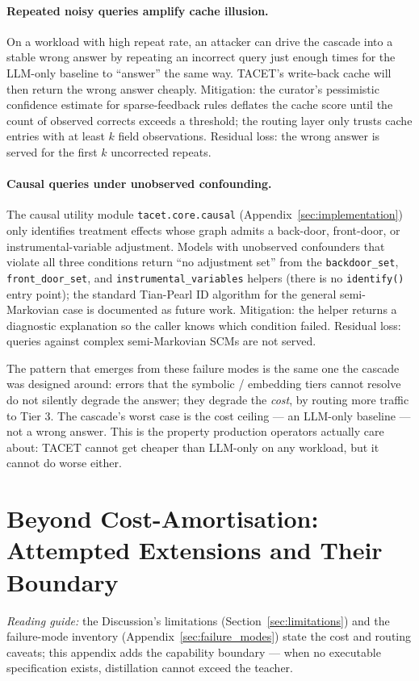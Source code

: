 \documentclass[11pt]{article}
\theoremstyle{plain}
\begin{document}
\paragraph{Repeated noisy queries amplify cache illusion.}
On a workload with high repeat rate, an attacker can drive the
cascade into a stable wrong answer by repeating an incorrect query
just enough times for the LLM-only baseline to ``answer'' the same
way.  TACET's write-back cache will then return the wrong answer
cheaply.  Mitigation: the curator's pessimistic confidence estimate
for sparse-feedback rules deflates the cache score until the count
of observed corrects exceeds a threshold; the routing layer only
trusts cache entries with at least $k$ field observations.  Residual
loss: the wrong answer is served for the first $k$ uncorrected
repeats.

\paragraph{Causal queries under unobserved confounding.}
\begin{sloppypar}
The causal
utility module \texttt{tacet.core.causal}
(Appendix~\ref{sec:implementation}) only identifies treatment effects whose
graph admits a back-door, front-door, or instrumental-variable
adjustment.  Models with
unobserved confounders that violate all three conditions return
``no adjustment set'' from the \texttt{backdoor\_set},
\texttt{front\_door\_set}, and \texttt{instrumental\_}\allowbreak\texttt{vari}\allowbreak\texttt{ables} helpers (there is
no \texttt{identify()} entry point); the
standard Tian-Pearl ID algorithm for the general semi-Markovian case is
documented as future work.  Mitigation: the helper returns a
diagnostic explanation so the caller knows which condition failed.
Residual loss: queries against complex semi-Markovian SCMs are not
served.
\end{sloppypar}

The pattern that emerges from these failure modes is the same one
the cascade was designed around: errors that the symbolic /
embedding tiers cannot resolve do not silently degrade the answer;
they degrade the \emph{cost}, by routing more traffic to Tier 3.
The cascade's worst case is the cost ceiling --- an LLM-only
baseline --- not a wrong answer.  This is the property production
operators actually care about: TACET cannot get cheaper than
LLM-only on any workload, but it cannot do worse either.

\section{Beyond Cost-Amortisation: Attempted Extensions and Their Boundary}
\label{sec:boundary}
\noindent\emph{Reading guide:} the Discussion's limitations
(Section~\ref{sec:limitations}) and the failure-mode inventory
(Appendix~\ref{sec:failure_modes}) state the cost and routing caveats; this
appendix adds the capability boundary --- when no executable specification
exists, distillation cannot exceed the teacher.
\end{document}

